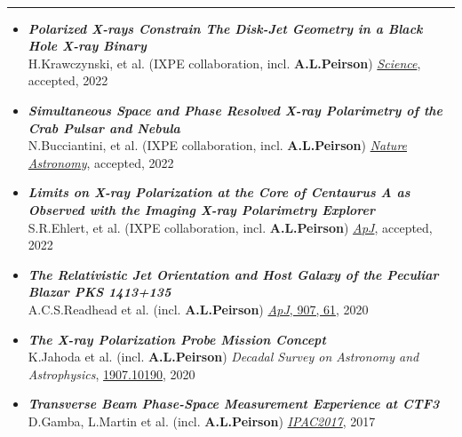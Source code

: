 \documentclass[11pt, oneside]{article}
\newenvironment{ressection}[1]{
	\vspace{4pt}
	{\selectfont\Large\color{Mycolor2}{\textbf{#1}}}
	\vspace{-6.5pt} \\
	\textcolor{Mycolor2}{\rule{\textwidth}{0.7pt}}
	\begin{itemize}
	\vspace{3pt}
}{
	\end{itemize}
}
\newcommand{\resitem}[1]{
	\vspace{-4pt}
	\item[] \begin{flushleft} #1 \end{flushleft}
}
\newenvironment{ressubsecPu}[1]{
	\resitem{#1}
	\vspace{2pt}

}
\newif\ifacademia
\begin{document}
\begin{ressection}{\textbf{Publications}}
\begin{ressubsecPu}{\textbf{\emph{Polarized X-rays Constrain The Disk-Jet Geometry in a Black Hole X-ray Binary}}\\ H.Krawczynski, et al. (IXPE collaboration, incl. \textbf{A.L.Peirson}) \href{https://arxiv.org/abs/2206.09972}{\emph{Science}}, accepted, 2022}
\end{ressubsecPu}
\vspace{1pt}

\begin{ressubsecPu}{\textbf{\emph{Simultaneous Space and Phase Resolved X-ray Polarimetry of the Crab Pulsar and Nebula}}\\ N.Bucciantini, et al. (IXPE collaboration, incl. \textbf{A.L.Peirson}) \href{https://arxiv.org/abs/2207.05573}{\emph{Nature Astronomy}}, accepted, 2022}
\end{ressubsecPu}
\vspace{1pt}

\begin{ressubsecPu}{\textbf{\emph{Limits on X-ray Polarization at the Core of Centaurus A as Observed with the Imaging X-ray Polarimetry Explorer}}\\ S.R.Ehlert, et al. (IXPE collaboration, incl. \textbf{A.L.Peirson}) \href{https://arxiv.org/abs/2207.06625}{\emph{ApJ}}, accepted, 2022}
\end{ressubsecPu}
\vspace{1pt}

\begin{ressubsecPu}{\textbf{\emph{The Relativistic Jet Orientation and Host Galaxy of the Peculiar Blazar PKS 1413+135}}\\ A.C.S.Readhead et al. (incl. \textbf{A.L.Peirson}) \href{http://arxiv.org/abs/2012.04045}{\emph{ApJ}, 907, 61}, 2020}
\end{ressubsecPu}
\vspace{1pt}

\ifacademia
\else
\begin{ressubsecPu}{\textbf{\emph{The X-ray Polarization Probe Mission Concept}}\\ K.Jahoda et al. (incl. \textbf{A.L.Peirson}) \emph{Decadal Survey on Astronomy and Astrophysics}, \href{https://arxiv.org/abs/1907.10190}{1907.10190}, 2020}
\end{ressubsecPu}
\vspace{1pt}
\fi

\begin{ressubsecPu}{\textbf{\emph{Transverse Beam Phase-Space Measurement Experience at CTF3}}\\ D.Gamba, L.Martin et al. (incl. \textbf{A.L.Peirson}) \href{http://accelconf.web.cern.ch/ipac2017/doi/JACoW-IPAC2017-MOPAB115.html}{\emph{IPAC2017}}, 2017}
\end{ressubsecPu}
\vspace{1pt}

\end{ressection}
\end{document}
